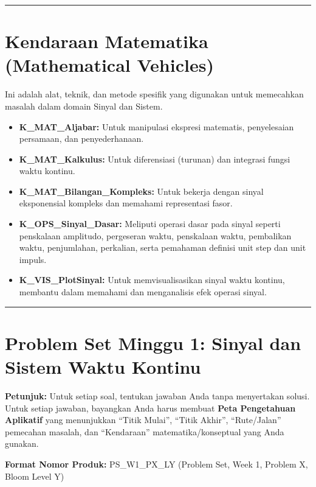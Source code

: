 \documentclass[
  letterpaper,
  DIV=11,
  numbers=noendperiod]{scrreprt}
\providecommand{\tightlist}{%
  \setlength{\itemsep}{0pt}\setlength{\parskip}{0pt}}\usepackage{longtable,booktabs,array}
\begin{document}
\begin{center}\rule{0.5\linewidth}{0.5pt}\end{center}

\section{Kendaraan Matematika (Mathematical
Vehicles)}\label{kendaraan-matematika-mathematical-vehicles}

Ini adalah alat, teknik, dan metode spesifik yang digunakan untuk
memecahkan masalah dalam domain Sinyal dan Sistem.

\begin{itemize}
\tightlist
\item
  \textbf{K\_MAT\_Aljabar:} Untuk manipulasi ekspresi matematis,
  penyelesaian persamaan, dan penyederhanaan.
\item
  \textbf{K\_MAT\_Kalkulus:} Untuk diferensiasi (turunan) dan integrasi
  fungsi waktu kontinu.
\item
  \textbf{K\_MAT\_Bilangan\_Kompleks:} Untuk bekerja dengan sinyal
  eksponensial kompleks dan memahami representasi fasor.
\item
  \textbf{K\_OPS\_Sinyal\_Dasar:} Meliputi operasi dasar pada sinyal
  seperti penskalaan amplitudo, pergeseran waktu, penskalaan waktu,
  pembalikan waktu, penjumlahan, perkalian, serta pemahaman definisi
  unit step dan unit impuls.
\item
  \textbf{K\_VIS\_PlotSinyal:} Untuk memvisualisasikan sinyal waktu
  kontinu, membantu dalam memahami dan menganalisis efek operasi sinyal.
\end{itemize}

\begin{center}\rule{0.5\linewidth}{0.5pt}\end{center}

\section{Problem Set Minggu 1: Sinyal dan Sistem Waktu
Kontinu}\label{problem-set-minggu-1-sinyal-dan-sistem-waktu-kontinu}

\textbf{Petunjuk:} Untuk setiap soal, tentukan jawaban Anda tanpa
menyertakan solusi. Untuk setiap jawaban, bayangkan Anda harus membuat
\textbf{Peta Pengetahuan Aplikatif} yang menunjukkan ``Titik Mulai'',
``Titik Akhir'', ``Rute/Jalan'' pemecahan masalah, dan ``Kendaraan''
matematika/konseptual yang Anda gunakan.

\textbf{Format Nomor Produk:} PS\_W1\_PX\_LY (Problem Set, Week 1,
Problem X, Bloom Level Y)
\end{document}
